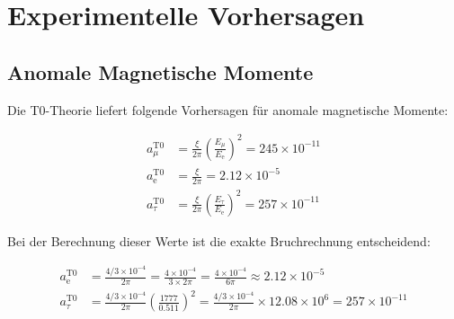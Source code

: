 \documentclass[12pt,a4paper]{article}
\newcommand{\ee}{\text{$\mathrm{e}$}}
\newcommand{\mmu}{\text{$\mu$}}
\newcommand{\ttau}{\text{$\tau$}}
\theoremstyle{definition}
\begin{document}
	\section{Experimentelle Vorhersagen}
	
	\subsection{Anomale Magnetische Momente}
	
	Die T0-Theorie liefert folgende Vorhersagen für anomale magnetische Momente:
	
	\begin{align}
		a_{\mmu}^{\text{T0}} &= \frac{\xi}{2\pi} \left(\frac{E_{\mmu}}{E_{\ee}}\right)^2 = 245 \times 10^{-11}\\
		a_{\ee}^{\text{T0}} &= \frac{\xi}{2\pi} = 2.12 \times 10^{-5}\\
		a_{\ttau}^{\text{T0}} &= \frac{\xi}{2\pi} \left(\frac{E_{\ttau}}{E_{\ee}}\right)^2 = 257 \times 10^{-11}
	\end{align}
	
	\begin{wichtig}
		Bei der Berechnung dieser Werte ist die exakte Bruchrechnung entscheidend:
		
		\begin{align}
			a_{\ee}^{\text{T0}} &= \frac{4/3 \times 10^{-4}}{2\pi} = \frac{4 \times 10^{-4}}{3 \times 2\pi} = \frac{4 \times 10^{-4}}{6\pi} \approx 2.12 \times 10^{-5}\\
			a_{\ttau}^{\text{T0}} &= \frac{4/3 \times 10^{-4}}{2\pi} \left(\frac{1777}{0.511}\right)^2 = \frac{4/3 \times 10^{-4}}{2\pi} \times 12.08 \times 10^6 = 257 \times 10^{-11}
		\end{align}
	\end{wichtig}
	
\end{document}
